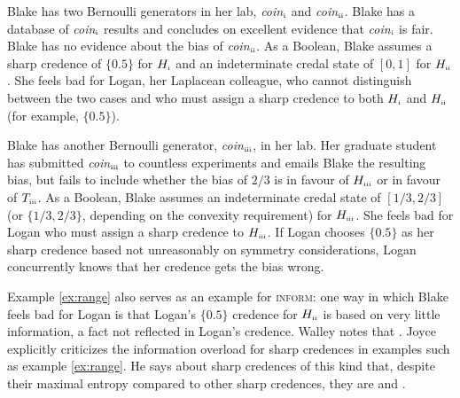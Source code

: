 \documentclass[11pt]{article}
\begin{document}
\begin{quotex}
  \label{ex:range} Blake has two Bernoulli generators
  in her lab, \textit{coin}$_{\mbox{\tiny{i}}}$ and
  \textit{coin}$_{\mbox{\tiny{ii}}}$. Blake has a database of
  \textit{coin}$_{\mbox{\tiny{i}}}$ results and concludes on excellent
  evidence that \textit{coin}$_{\mbox{\tiny{i}}}$ is fair. Blake has
  no evidence about the bias of \textit{coin}$_{\mbox{\tiny{ii}}}$. As
  a Boolean, Blake assumes a sharp credence of $\{0.5\}$ for
  $H_{\mbox{\tiny{i}}}$ and an indeterminate credal state of $[0,1]$
  for $H_{\mbox{\tiny{ii}}}$. She feels bad for Logan, her Laplacean
  colleague, who cannot distinguish between the two cases and who must
  assign a sharp credence to both $H_{\mbox{\tiny{i}}}$ and
  $H_{\mbox{\tiny{ii}}}$ (for example, $\{0.5\}$).
\end{quotex}

\begin{quotex}
  \label{ex:incomp} Blake has another Bernoulli
  generator, \textit{coin}$_{\mbox{\tiny{iii}}}$, in her lab. Her
  graduate student has submitted \textit{coin}$_{\mbox{\tiny{iii}}}$
  to countless experiments and emails Blake the resulting bias, but
  fails to include whether the bias of $2/3$ is in favour of
  $H_{\mbox{\tiny{iii}}}$ or in favour of $T_{\mbox{\tiny{iii}}}$. As
  a Boolean, Blake assumes an indeterminate credal state of
  $[1/3,2/3]$ (or $\{1/3,2/3\}$, depending on the convexity
  requirement) for $H_{\mbox{\tiny{iii}}}$. She feels bad for Logan
  who must assign a sharp credence to $H_{\mbox{\tiny{iii}}}$. If
  Logan chooses $\{0.5\}$ as her sharp credence based not unreasonably
  on symmetry considerations, Logan concurrently knows that her
  credence gets the bias wrong.
\end{quotex}

Example \ref{ex:range} also serves as an example for \textsc{inform}:
one way in which Blake feels bad for Logan is that Logan's $\{0.5\}$
credence for $H_{\mbox{\tiny{ii}}}$ is based on very little
information, a fact not reflected in Logan's credence. Walley notes
that 
. Joyce explicitly criticizes the information
overload for sharp credences in examples such as example
\ref{ex:range}. He says about sharp credences of this kind that,
despite their maximal entropy compared to other sharp credences, they
are  and  .
\end{document}
